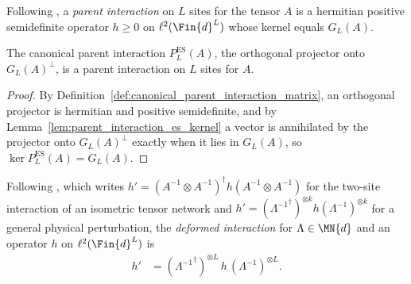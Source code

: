 \begin{definition}\label{def:is_parent_interaction}
    \leanok
    Following \cite[Section~IV.C, Definition (Parent Hamiltonian)]{Cirac2021Matrix},
    a \emph{parent interaction} on $L$ sites for the tensor $A$ is a hermitian
    positive semidefinite operator $h\ge0$ on $\ell^2(\Fin{d}^{L})$ whose kernel
    equals $G_L(A)$.
\end{definition}

\begin{lemma}\label{thm:canonical_parent_interaction_is_parent_interaction}
    \leanok
    The canonical parent interaction $P_L^{\mathrm{ES}}(A)$, the orthogonal
    projector onto $G_L(A)^\perp$, is a parent interaction on $L$ sites for $A$.
\end{lemma}

\begin{proof}
    \leanok
    By Definition~\ref{def:canonical_parent_interaction_matrix}, an orthogonal
    projector is hermitian and positive semidefinite, and by
    Lemma~\ref{lem:parent_interaction_es_kernel} a vector is annihilated by the
    projector onto $G_L(A)^\perp$ exactly when it lies in $G_L(A)$, so
    $\ker P_L^{\mathrm{ES}}(A)=G_L(A)$.
\end{proof}

\begin{definition}\label{def:deformed_interaction}
    \leanok
    Following \cite[Section~IV.C]{Cirac2021Matrix}, which writes
    $h'=(A^{-1}\otimes A^{-1})^\dagger h(A^{-1}\otimes A^{-1})$ for the
    two-site interaction of an isometric tensor network and
    $h'=({\Lambda^{-1}}^\dagger)^{\otimes k}h(\Lambda^{-1})^{\otimes k}$ for a
    general physical perturbation, the \emph{deformed interaction} for
    $\Lambda\in\MN{d}$ and an operator $h$ on $\ell^2(\Fin{d}^{L})$ is
    \begin{align}
        h' & =({\Lambda^{-1}}^\dagger)^{\otimes L}\,h\,(\Lambda^{-1})^{\otimes L}.
        \label{eq:deformed_interaction}
    \end{align}
\end{definition}

